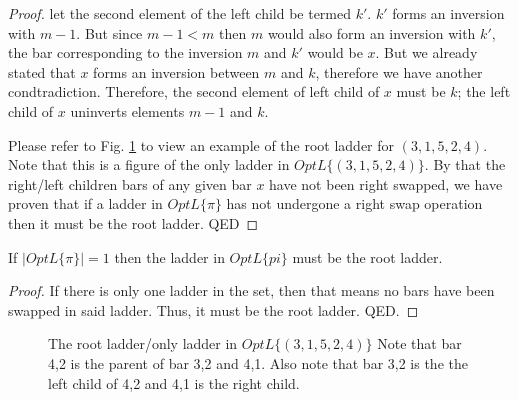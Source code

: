 \begin{proof}
	 let the second element of the left child be termed $k'$. 
	 $k'$ forms an inversion with $m-1$. But since $m-1 < m$ then $m$ would also form an inversion with $k'$, the 
	 bar corresponding to the inversion $m$ and $k'$ would be $x$. But we already stated that $x$ forms 
	 an inversion between $m$ and $k$, therefore we have another condtradiction. 
	 Therefore, the second element of left child of $x$ must be $k$; the left child of $x$ uninverts elements 
	 $m-1$ and $k$. \par 
	 Please refer to Fig. \ref{Fig:RootChildBars} to view an example of the root ladder for $(3,1,5,2,4)$. Note 
	 that this is a figure of the only ladder in $OptL\{(3,1,5,2,4)\}$.
	 By that the right/left children bars of any given bar 
	 $x$ have not been right swapped, we have proven that if a ladder in $OptL\{\pi\}$ has not undergone 
	 a right swap operation then it must be the root ladder. QED\pagebreak

   
 \end{proof}
 \begin{corollary}
	 If $|OptL\{\pi\}|=1$ then the ladder in $OptL\{pi\}$ must be the root ladder.
 \end{corollary}
 \begin{proof}
	 If there is only one ladder in the set, then that means no bars have been swapped in said ladder. 
	 Thus, it must be the root ladder. QED.
 \end{proof}


 \begin{figure}[!htp]
     \begin{center}
     \end{center}
     \caption{The root ladder/only ladder in $OptL\{(3,1,5,2,4)\}$ Note that bar 4,2 is the parent of bar 3,2 and 4,1. Also note that 
	 bar 3,2 is the the left child of 4,2 and 4,1 is the right child.}
	 \label{Fig:RootChildBars}
 \end{figure}

